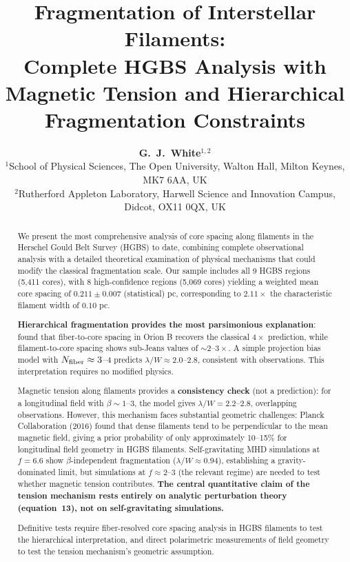 \documentclass[11pt,a4paper]{article}
\title{\textbf{Fragmentation of Interstellar Filaments:\\
Complete HGBS Analysis with Magnetic Tension and Hierarchical Fragmentation Constraints}}
\author{\textbf{G.~J.~White$^{1,2}$}\\
\small{$^{1}$School of Physical Sciences, The Open University, Walton Hall, Milton Keynes, MK7 6AA, UK}\\
\small{$^{2}$Rutherford Appleton Laboratory, Harwell Science and Innovation Campus, Didcot, OX11 0QX, UK}}
\begin{document}
\maketitle

\begin{abstract}
We present the most comprehensive analysis of core spacing along filaments in the Herschel Gould Belt Survey (HGBS) to date, combining complete observational analysis with a detailed theoretical examination of physical mechanisms that could modify the classical fragmentation scale. Our sample includes all 9 HGBS regions (5,411 cores), with 8 high-confidence regions (5,069 cores) yielding a weighted mean core spacing of $0.211 \pm 0.007$ (statistical) pc, corresponding to $2.11\times$ the characteristic filament width of $0.10$ pc.

\textbf{Hierarchical fragmentation provides the most parsimonious explanation}: \citet{Yang2024} found that fiber-to-core spacing in Orion B recovers the classical $4\times$ prediction, while filament-to-core spacing shows sub-Jeans values of $\sim2$--$3\times$. A simple projection bias model with $N_{\rm fiber} \approx 3$--$4$ predicts $\lambda/W \approx 2.0$--$2.8$, consistent with observations. This interpretation requires no modified physics.

Magnetic tension along filaments provides a \textbf{consistency check} (not a prediction): for a longitudinal field with $\beta \sim 1$--$3$, the model gives $\lambda/W = 2.2$--$2.8$, overlapping observations. However, this mechanism faces substantial geometric challenges: Planck Collaboration (2016) found that dense filaments tend to be perpendicular to the mean magnetic field, giving a prior probability of only approximately 10--15\% for longitudinal field geometry in HGBS filaments. Self-gravitating MHD simulations at $f = 6.6$ show $\beta$-independent fragmentation ($\lambda/W \approx 0.94$), establishing a gravity-dominated limit, but simulations at $f \approx 2$--$3$ (the relevant regime) are needed to test whether magnetic tension contributes. \textbf{The central quantitative claim of the tension mechanism rests entirely on analytic perturbation theory (equation~13), not on self-gravitating simulations.}

Definitive tests require fiber-resolved core spacing analysis in HGBS filaments to test the hierarchical interpretation, and direct polarimetric measurements of field geometry to test the tension mechanism's geometric assumption.
\end{abstract}
\end{document}
